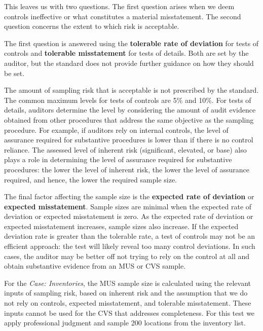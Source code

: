 \bigskip
This leaves us with two questions. The first question arises when we deem controls ineffective or what constitutes a material misstatement. The second question concerns the extent to which risk is acceptable.

The first question is answered using the \textbf{tolerable rate of deviation} for tests of controls and \textbf{tolerable misstatement} for tests of details. Both are set by the auditor, but the standard does not provide further guidance on how they should be set. 

The amount of sampling risk that is acceptable is not prescribed by the standard. The common maximum levels for tests of controls are 5\% and 10\%. For tests of details, auditors determine the level by considering the amount of audit evidence obtained from other procedures that address the same objective as the sampling procedure. For example, if auditors rely on internal controls, the level of assurance required for substantive procedures is lower than if there is no control reliance. The assessed level of inherent risk (significant, elevated, or base) also plays a role in determining the level of assurance required for substantive procedures: the lower the level of inherent risk, the lower the level of assurance required, and hence, the lower the required sample size.

The final factor affecting the sample size is the \textbf{expected rate of deviation} or \textbf{expected misstatement}. Sample sizes are minimal when the expected rate of deviation or expected misstatement is zero. As the expected rate of deviation or expected misstatement increases, sample sizes also increase. If the expected deviation rate is greater than the tolerable rate, a test of controls may not be an efficient approach: the test will likely reveal too many control deviations. In such cases, the auditor may be better off not trying to rely on the control at all and obtain substantive evidence from an MUS or CVS sample.

For the \emph{Case: Inventories}, the MUS sample size is calculated using the relevant inputs of sampling risk, based on inherent risk and the assumption that we do not rely on controls, expected misstatement, and tolerable misstatement. These inputs cannot be used for the CVS that addresses completeness. For this test we apply professional judgment and sample 200 locations from the inventory list.

